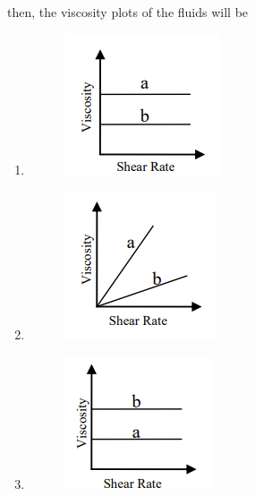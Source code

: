 \documentclass[12pt]{article}
\begin{document}
\begin{enumerate}
then, the viscosity plots of the fluids will be
\begin{multicols}{2}
\begin{enumerate}
\item \begin{figure}[H]
    \centering
    \includegraphics[width=0.5\columnwidth]{figs/ass2_f_q11_a.png}
    \caption{}
    \label{fig:placeholder}
\end{figure}
\item\begin{figure}[H]
    \centering
    \includegraphics[width=0.5\columnwidth]{figs/ass2_f_q11_b.png}
    \caption{}
    \label{fig:placeholder}
\end{figure}
\item \begin{figure}[H]
    \centering
    \includegraphics[width=0.5\columnwidth]{figs/ass2_f_q11_c.png}

\end{figure}
\end{enumerate}
\end{multicols}
\end{enumerate}
\end{document}
